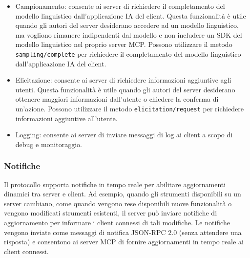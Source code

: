 \begin{itemize}
\item Campionamento: consente ai server di richiedere il completamento del modello linguistico dall'applicazione IA del client. Questa funzionalità è utile quando gli autori del server desiderano accedere ad un modello linguistico, ma vogliono rimanere indipendenti dal modello e non includere un SDK del modello linguistico nel proprio server MCP. Possono utilizzare il metodo \texttt{sampling/complete} per richiedere il completamento del modello linguistico dall'applicazione IA del client.
\item Elicitazione: consente ai server di richiedere informazioni aggiuntive agli utenti. Questa funzionalità è utile quando gli autori del server desiderano ottenere maggiori informazioni dall'utente o chiedere la conferma di un'azione. Possono utilizzare il metodo \texttt{elicitation/request} per richiedere informazioni aggiuntive all'utente.
\item Logging: consente ai server di inviare messaggi di log ai client a scopo di debug e monitoraggio.
\cite{modelcontextprotocol2024arch}
\end{itemize}

\subsubsection{Notifiche}
Il protocollo supporta notifiche in tempo reale per abilitare aggiornamenti dinamici tra server e client. Ad esempio, quando gli strumenti disponibili su un server cambiano, come quando vengono rese disponibili nuove funzionalità o vengono modificati strumenti esistenti, il server può inviare notifiche di aggiornamento per informare i client connessi di tali modifiche. Le notifiche vengono inviate come messaggi di notifica JSON-RPC 2.0 (senza attendere una risposta) e consentono ai server MCP di fornire aggiornamenti in tempo reale ai client connessi.
\cite{modelcontextprotocol2024arch}
